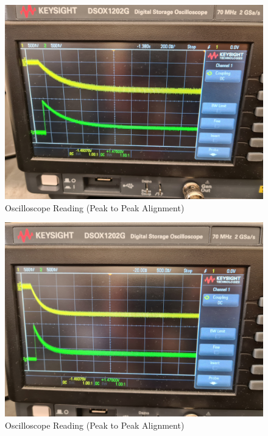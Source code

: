 \documentclass[a4paper,12pt]{article}
\begin{document}
\begin{figure}[H]
  \centering
  \includegraphics[width=1.0\linewidth]{../data/20211116_101002.jpg}    
  \begin{center}
    \begin{center}   
    \end{center}  \end{center}
  \caption{Oscilloscope Reading (Peak to Peak Alignment)}
  \label{osc}
\end{figure}

\begin{figure}[H]
  \centering
  \includegraphics[width=1.0\linewidth]{../data/20211116_101233.jpg}    
  \begin{center}
    \begin{center}   
    \end{center}  \end{center}
  \caption{Oscilloscope Reading (Peak to Peak Alignment)}
  \label{osc}
\end{figure}
\end{document}
